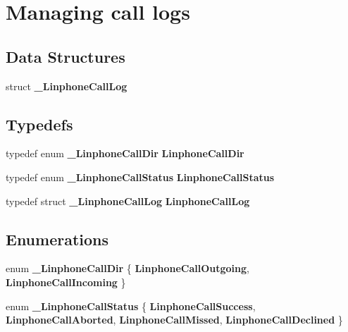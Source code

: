 \section{\-Managing call logs}
\label{group__call__logs}
\subsection*{\-Data \-Structures}
\begin{DoxyCompactItemize}
\item 
struct {\bf \-\_\-\-Linphone\-Call\-Log}
\end{DoxyCompactItemize}
\subsection*{\-Typedefs}
\begin{DoxyCompactItemize}
\item 
typedef enum {\bf \-\_\-\-Linphone\-Call\-Dir} {\bf \-Linphone\-Call\-Dir}
\item 
typedef enum {\bf \-\_\-\-Linphone\-Call\-Status} {\bf \-Linphone\-Call\-Status}
\item 
typedef struct {\bf \-\_\-\-Linphone\-Call\-Log} {\bf \-Linphone\-Call\-Log}
\end{DoxyCompactItemize}
\subsection*{\-Enumerations}
\begin{DoxyCompactItemize}
\item 
enum {\bf \-\_\-\-Linphone\-Call\-Dir} \{ \*
{\bf \-Linphone\-Call\-Outgoing}, 
\*
{\bf \-Linphone\-Call\-Incoming}
 \}
\item 
enum {\bf \-\_\-\-Linphone\-Call\-Status} \{ \*
{\bf \-Linphone\-Call\-Success}, 
\*
{\bf \-Linphone\-Call\-Aborted}, 
\*
{\bf \-Linphone\-Call\-Missed}, 
\*
{\bf \-Linphone\-Call\-Declined}
 \}
\end{DoxyCompactItemize}
